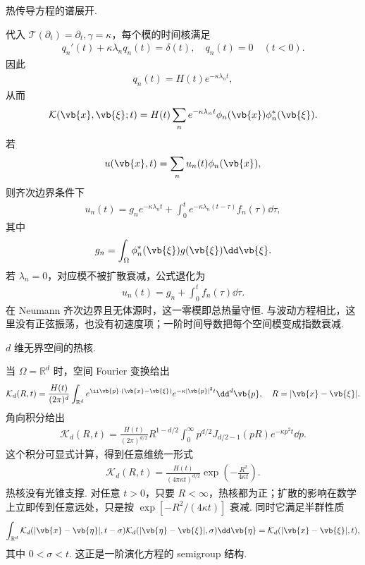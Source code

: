 \begin{exbox}
	热传导方程的谱展开.
	
	代入 \(\mathcal{T}(\partial_t)=\partial_t,\gamma=\kappa\)，每个模的时间核满足
	\begin{align*}
		q_n'(t)+\kappa\lambda_n q_n(t)=\delta(t),
		\quad q_n(t)=0\quad(t<0).
	\end{align*}
	因此
	\begin{align*}
		q_n(t)=H(t)e^{-\kappa\lambda_nt},
	\end{align*}
	从而
	\begin{align*}
		\mathcal{K}(\vb{x},\vb{\xi};t)
		=H(t)\sum_n e^{-\kappa\lambda_nt}\phi_n(\vb{x})\phi_n^*(\vb{\xi}).
	\end{align*}
	若
	\begin{align*}
		u(\vb{x},t)=\sum_nu_n(t)\phi_n(\vb{x}),
	\end{align*}
	则齐次边界条件下
	\begin{align*}
		u_n(t)=g_ne^{-\kappa\lambda_nt}
		+\int_0^t e^{-\kappa\lambda_n(t-\tau)}f_n(\tau)\dd\tau,
	\end{align*}
	其中
	\begin{align*}
		g_n=\int_\Omega\phi_n^*(\vb{\xi})g(\vb{\xi})\dd\vb{\xi}.
	\end{align*}
	若 \(\lambda_n=0\)，对应模不被扩散衰减，公式退化为
	\begin{align*}
		u_n(t)=g_n+\int_0^t f_n(\tau)\dd\tau.
	\end{align*}
	在 Neumann 齐次边界且无体源时，这一零模即总热量守恒. 与波动方程相比，这里没有正弦振荡，也没有初速度项；一阶时间导数把每个空间模变成指数衰减.
\end{exbox}

\begin{exbox}
	\(d\) 维无界空间的热核.
	
	当 \(\Omega=\mathbb{R}^d\) 时，空间 Fourier 变换给出
	\begin{align*}
		\mathcal{K}_d(R,t)
		=\frac{H(t)}{(2\pi)^d}\int_{\mathbb{R}^d}
		e^{\ii\vb{p}\cdot(\vb{x}-\vb{\xi})}e^{-\kappa|\vb{p}|^2t}\dd^d\vb{p},
		\quad R=|\vb{x}-\vb{\xi}|.
	\end{align*}
	角向积分给出
	\begin{align*}
		\mathcal{K}_d(R,t)
		=\frac{H(t)}{(2\pi)^{d/2}}R^{1-d/2}
		\int_0^\infty p^{d/2}J_{d/2-1}(pR)e^{-\kappa p^2t}\dd p.
	\end{align*}
	这个积分可显式计算，得到任意维统一形式
	\begin{align*}
		\mathcal{K}_d(R,t)
		=\frac{H(t)}{(4\pi\kappa t)^{d/2}}
		\exp\left(-\frac{R^2}{4\kappa t}\right).
	\end{align*}
	热核没有光锥支撑. 对任意 \(t>0\)，只要 \(R<\infty\)，热核都为正；扩散的影响在数学上立即传到任意远处，只是按 \(\exp[-R^2/(4\kappa t)]\) 衰减. 同时它满足半群性质
	\begin{align*}
		\int_{\mathbb{R}^d}\mathcal{K}_d(|\vb{x}-\vb{\eta}|,t-\sigma)
		\mathcal{K}_d(|\vb{\eta}-\vb{\xi}|,\sigma)\dd\vb{\eta}
		=\mathcal{K}_d(|\vb{x}-\vb{\xi}|,t),
	\end{align*}
	其中 \(0<\sigma<t\). 这正是一阶演化方程的 semigroup 结构.
\end{exbox}

